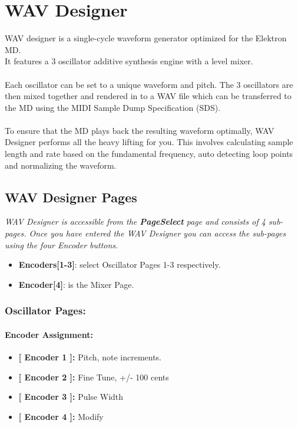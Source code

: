 \chapter{WAV Designer}
WAV designer is a single-cycle waveform generator optimized for the Elektron MD.\\
It features a 3 oscillator additive synthesis engine with a level mixer.\\
\\
Each oscillator can be set to a unique waveform and pitch. The 3 oscillators are then mixed together and rendered in to a WAV file which can be transferred to the MD using the MIDI Sample Dump Specification (SDS).\\
\\
To ensure that the MD plays back the resulting waveform optimally, WAV Designer performs all the heavy lifting for you. This involves calculating sample length and rate based on the fundamental frequency, auto detecting loop points and normalizing the waveform.
\section{WAV Designer Pages}
\textit{WAV Designer is accessible from the \textbf{PageSelect} page and consists of 4 sub-pages. Once you have entered the WAV Designer you can access the sub-pages using the four Encoder buttons.}

\begin{itemize}
\item \textbf{Encoders[1-3]}: select Oscillator Pages 1-3 respectively.
\item \textbf{Encoder[4]}: is the Mixer Page.
\end{itemize}

\subsection{Oscillator Pages:}
\subsubsection{Encoder Assignment:}
\begin{itemize}
	\item \textbf{[ Encoder 1 ]: } Pitch, note increments.
	\item \textbf{[ Encoder 2 ]: } Fine Tune, +/- 100 cents
	\item \textbf{[ Encoder 3 ]: } Pulse Width
	\item \textbf{[ Encoder 4 ]: } Modify
\end{itemize}
